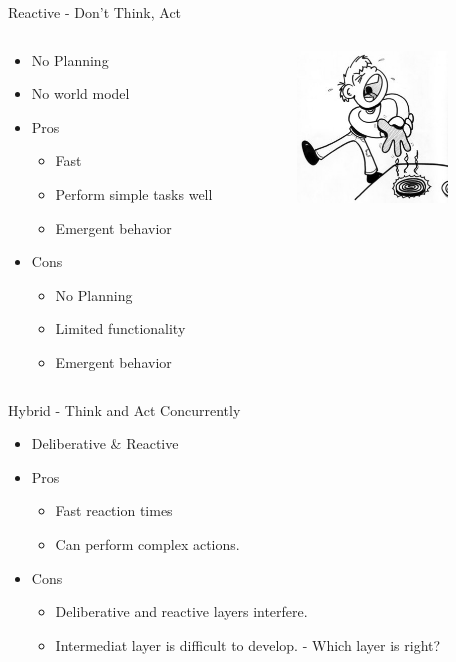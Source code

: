 \documentclass{beamer}
\begin{document}
\begin{frame}{Reactive - Don't Think, Act}
 \begin{columns}[T]
  \begin{column}[T]{6cm}
  \begin{itemize}
    \item No Planning
    \item No world model
    \item Pros
    \begin{itemize}
    \item Fast
    \item Perform simple tasks well
    \item Emergent behavior
    \end{itemize}
    \item Cons
    \begin{itemize}
    \item No Planning
    \item Limited functionality
    \item Emergent behavior
    \end{itemize}
  \end{itemize}
  \end{column}
  \begin{column}[T]{4cm}
  \centering
   \includegraphics[width=4cm]{stove.jpg}
  \end{column}
 \end{columns}
\end{frame}

\begin{frame}{Hybrid - Think and Act Concurrently}
 \begin{itemize}
  \item Deliberative \& Reactive
  \item Pros
  \begin{itemize}
   \item Fast reaction times
   \item Can perform complex actions.
  \end{itemize}
  \item Cons
  \begin{itemize}
   \item Deliberative and reactive layers interfere.
   \item Intermediat layer is difficult to develop. - Which layer is right?
  \end{itemize}
 \end{itemize}
\end{frame}
\end{document}
